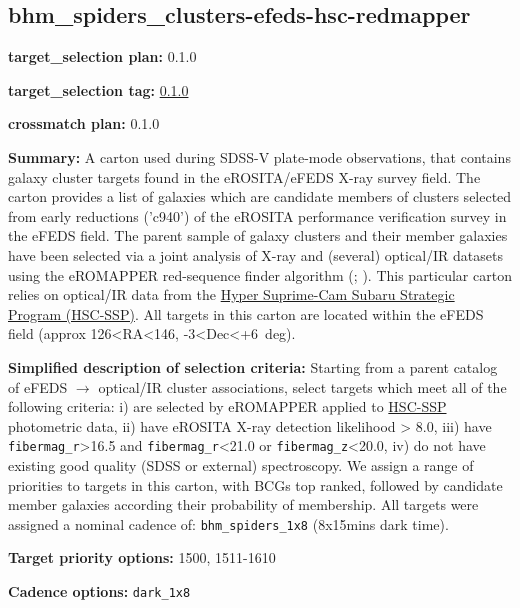 \hypertarget{bhm_spiders_clusters-efeds-hsc-redmapper_plan0.1.0}{%
\subsection{bhm\_spiders\_clusters-efeds-hsc-redmapper}\label{bhm_spiders_clusters-efeds-hsc-redmapper_plan0.1.0}}

\noindent\textbf{target\_selection plan:} 0.1.0

\noindent\textbf{target\_selection tag:}
\href{https://github.com/sdss/target_selection/tree/0.1.0/}{0.1.0}

\noindent\textbf{crossmatch plan:} 0.1.0

\noindent\textbf{Summary:} A carton used during SDSS-V plate-mode observations,
that contains galaxy cluster targets found in the eROSITA/eFEDS X-ray
survey field. The carton provides a list of galaxies which are candidate
members of clusters selected from early reductions ('c940') of the
eROSITA performance verification survey in the eFEDS field. The parent
sample of galaxy clusters and their member galaxies have been selected
via a joint analysis of X-ray and (several) optical/IR datasets using
the eROMAPPER red-sequence finder algorithm
(\citealt{Rykoff2014};
\citealt{IderChitham2020}). This particular carton relies on optical/IR data
from the \href{https://hsc.mtk.nao.ac.jp/ssp/}{Hyper Suprime-Cam Subaru
Strategic Program (HSC-SSP)}. All targets in this carton are located
within the eFEDS field (approx 126\textless RA\textless146,
-3\textless Dec\textless+6~deg).

\noindent\textbf{Simplified description of selection criteria:} Starting from a
parent catalog of eFEDS $\rightarrow$ optical/IR cluster associations, select
targets which meet all of the following criteria: i) are selected by
eROMAPPER applied to \href{https://hsc.mtk.nao.ac.jp/ssp/}{HSC-SSP}
photometric data, ii) have eROSITA X-ray detection likelihood
\textgreater{} 8.0, iii) have \texttt{fibermag\_r}\textgreater16.5 and
\texttt{fibermag\_r}\textless21.0 or \texttt{fibermag\_z}\textless20.0,
iv) do not have existing good quality (SDSS or external) spectroscopy.
We assign a range of priorities to targets in this carton, with BCGs top
ranked, followed by candidate member galaxies according their
probability of membership. All targets were assigned a nominal cadence
of: \texttt{bhm\_spiders\_1x8} (8x15mins dark time).


\noindent\textbf{Target priority options:} 1500, 1511-1610

\noindent\textbf{Cadence options:} \texttt{dark\_1x8}

